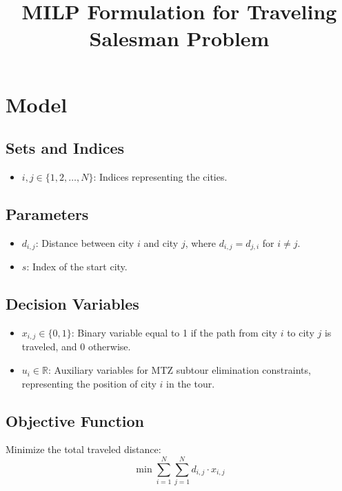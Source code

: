 \documentclass{article}
\begin{document}
\title{MILP Formulation for Traveling Salesman Problem}
\author{}
\date{}
\maketitle

\section*{Model}

\subsection*{Sets and Indices}
\begin{itemize}
    \item $i, j \in \{1, 2, \ldots, N\}$: Indices representing the cities.
\end{itemize}

\subsection*{Parameters}
\begin{itemize}
    \item $d_{i,j}$: Distance between city $i$ and city $j$, where $d_{i,j} = d_{j,i}$ for $i \neq j$.
    \item $s$: Index of the start city.
\end{itemize}

\subsection*{Decision Variables}
\begin{itemize}
    \item $x_{i,j} \in \{0, 1\}$: Binary variable equal to 1 if the path from city $i$ to city $j$ is traveled, and 0 otherwise.
    \item $u_i \in \mathbb{R}$: Auxiliary variables for MTZ subtour elimination constraints, representing the position of city $i$ in the tour.
\end{itemize}

\subsection*{Objective Function}
Minimize the total traveled distance:
\[
\min \sum_{i=1}^{N} \sum_{j=1}^{N} d_{i,j} \cdot x_{i,j}
\]
\end{document}
